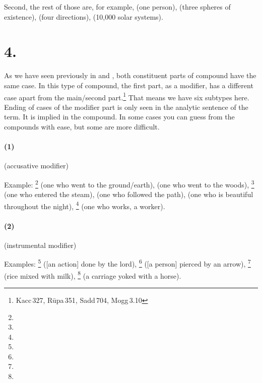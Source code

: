 Second, the rest of those are, for example,  (one person),  (three spheres of existence),  (four directions),  (10,000 solar systems).

\section*{4. }\label{sec:tappu}

As we have seen previously in  and , both constituent parts of compound have the same case. In this type of compound, the first part, as a modifier, has a different case apart from the main/second part.\footnote{Kacc\,327, R\=upa\,351, Sadd\,704, Mogg\,3.10} That means we have six subtypes here. Ending of cases of the modifier part is only seen in the analytic sentence of the term. It is implied in the compound. In some cases you can guess from the compounds with ease, but some are more difficult.

\paragraph*{(1) } (accusative modifier)\par
Example: \footnote{} (one who went to the ground/earth),  (one who went to the woods), \footnote{} (one who entered the steam),  (one who followed the path),  (one who is beautiful throughout the night), \footnote{} (one who works, a worker).

\paragraph*{(2) } (instrumental modifier)\par
Examples: \footnote{} ([an action] done by the lord), \footnote{} ([a person] pierced by an arrow), \footnote{} (rice mixed with milk), \footnote{} (a carriage yoked with a horse).

